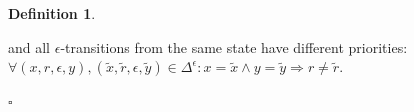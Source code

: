 \documentclass{article}
\newcommand{\Xin}{\!\in\!}
\newcommand{\Xeq}{\!=\!}
\newcommand*{\Xbar}[1]{\overline{#1\vphantom{\bar{#1}}}}
\theoremstyle{definition}
\newtheorem{Xdef}{Definition}
\begin{document}
\begin{multicols}{2}
\begin{Xdef}
\begin{itemize}

        and all $\epsilon$-transitions from the same state have different priorities:
        $\forall (x, r, \epsilon, y), (\widetilde{x}, \widetilde{r}, \epsilon, \widetilde{y}) \Xin \Delta^\epsilon:
        x \Xeq \widetilde{x} \wedge y \Xeq \widetilde{y} \Rightarrow r \!\neq\! \widetilde{r}$.
    \end{itemize}
    $\square$
    \end{Xdef}


\end{multicols}
\end{document}
